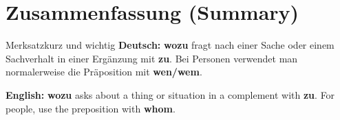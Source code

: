 \documentclass[a4paper,11pt]{article}
\newcommand{\GermanText}[1]{\textbf{Deutsch: }#1\par}
\newcommand{\EnglishText}[1]{{\small\color{SoftGray}\textbf{English: }#1\par}}
\begin{document}
\section{Zusammenfassung (Summary)}
\begin{grammarentry}{Merksatz}{kurz und wichtig}
\GermanText{\textbf{wozu} fragt nach einer Sache oder einem Sachverhalt in einer Ergänzung mit \textbf{zu}. Bei Personen verwendet man normalerweise die Präposition mit \textbf{wen/wem}.}
\EnglishText{\textbf{wozu} asks about a thing or situation in a complement with \textbf{zu}. For people, use the preposition with \textbf{whom}.}
\end{grammarentry}
\end{document}

